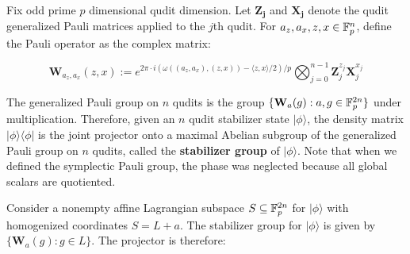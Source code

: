 %



Fix odd prime $p$ dimensional qudit dimension.  
Let $\mathbf{Z_j}$ and $\mathbf{X_j}$ denote the qudit generalized Pauli matrices applied to the $j$th qudit.
For $a_z,a_x,z,x\in \mathbb{F}_p^n $, define the Pauli operator as the complex matrix:

$$\mathbf{W}_{a_z,a_x}(z,x):= e^{2\pi\cdot i ( \omega ((a_z,a_x),(z,x)) -\langle z,x\rangle/2 )/p}   \bigotimes_{j=0}^{n-1}  \mathbf{Z}_j^{z_j} \mathbf{X}_j^{x_j}$$

The generalized Pauli group on $n$ qudits is the group $\{ \mathbf{W}_a(g): a,g \in \mathbb{F}_p^{2n}\}$ under multiplication. Therefore, given an $n$ qudit stabilizer state $|\phi \rangle$, the density matrix $| \phi \rangle\langle\phi |$ is the joint projector onto a maximal Abelian subgroup of the generalized Pauli group on $n$ qudits, called the {\bf stabilizer group} of  $|\phi \rangle$.  Note that when we defined the symplectic Pauli group, the phase was neglected because all global scalars are quotiented.


Consider a nonempty  affine Lagrangian subspace $S \subseteq \mathbb{F}_p^{2n}$ for $|\phi\rangle$ with homogenized coordinates $S=L+a$.  The stabilizer group for $| \phi\rangle $ is given by $\{ \mathbf{W}_a(g): g \in L \}$.  The projector is therefore:
 
